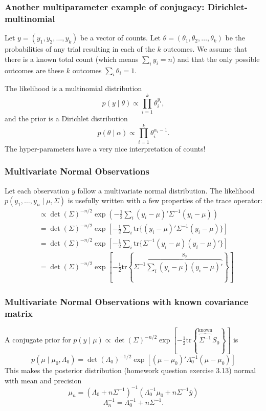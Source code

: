 \documentclass{beamer}
\begin{document}
\begin{frame}[fragile]
\frametitle{Another multiparameter example of conjugacy: Dirichlet-multinomial}

Let $y = (y_1, y_2, \ldots, y_k)$ be a vector of counts. Let $\theta = (\theta_1, \theta_2, \ldots, \theta_k)$ be the probabilities of any trial resulting in each of the $k$ outcomes. We assume that there is a known total count (which means $\sum_i y_i = n$) and that the only possible outcomes are these $k$ outcomes $\sum_i \theta_i = 1$.
\newline

The likelihood is a multinomial distribution
$$
p(y \mid \theta) \propto \prod_{i=1}^k \theta_i^{y_i},
$$
and the prior is a Dirichlet distribution
$$
p(\theta \mid \alpha) \propto \prod_{i=1}^k \theta_i^{\alpha_i - 1}.
$$
The hyper-parameters have a very nice interpretation of counts!
\end{frame}

\begin{frame}[fragile]
\frametitle{Multivariate Normal Observations}

Let each observation $y$ follow a multivariate normal distribution. The likelihood $p(y_1, \ldots, y_n \mid \mu, \Sigma)$ is usefully written with a few properties of the trace operator:
\begin{align*}
&\propto \det(\Sigma)^{-n/2} \exp\left(-\frac{1}{2}\sum_i (y_i - \mu)'\Sigma^{-1}(y_i- \mu) \right) \\
&= \det(\Sigma)^{-n/2} \exp\left[-\frac{1}{2}\sum_i \text{tr}\{ (y_i - \mu)'\Sigma^{-1}(y_i- \mu) \} \right] \\
&= \det(\Sigma)^{-n/2} \exp\left[-\frac{1}{2}\sum_i \text{tr}\{ \Sigma^{-1}(y_i- \mu)(y_i - \mu)' \} \right] \\
&= \det(\Sigma)^{-n/2} \exp\left[-\frac{1}{2} \text{tr}\left\{\Sigma^{-1} \overbrace{\sum_i  (y_i- \mu)(y_i - \mu)'}^{S_0} \right\} \right]
\end{align*}

\end{frame}

\begin{frame}[fragile]
\frametitle{Multivariate Normal Observations with known covariance matrix}

A conjugate prior for $p(y \mid \mu) \propto \det(\Sigma)^{-n/2} \exp\left[-\frac{1}{2} \text{tr}\left\{\overbrace{\Sigma^{-1}}^{ \text{known} } S_0 \right\} \right]$ is
$$
p(\mu \mid \mu_0, \Lambda_0) = \det(\Lambda_0)^{-1/2} \exp\left[(\mu - \mu_0)'\Lambda_0^{-1}(\mu - \mu_0) \right]
$$
This makes the posterior distribution (homework question exercise 3.13) normal with mean and precision
\[
\mu_n  = (\Lambda_0 + n \Sigma^{-1})^{-1}(\Lambda_0^{-1} \mu_0 + n \Sigma^{-1} \bar{y})
\]
\[
\Lambda_n^{-1} = \Lambda_0^{-1} + n \Sigma^{-1}.
\]
\end{frame}
\end{document}
